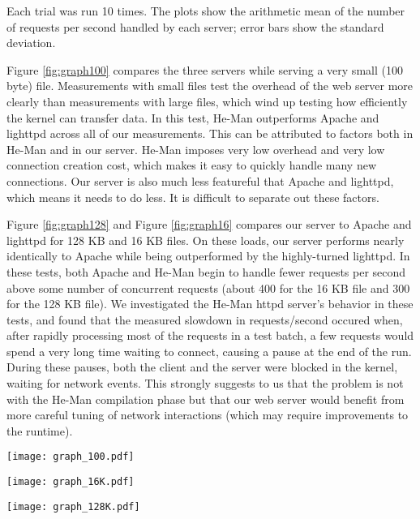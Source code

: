 \documentclass[preprint]{sigplanconf}
\begin{document}
Each trial was run 10 times. The plots show the arithmetic mean of the number of
requests per second handled by each server; error bars show the standard
deviation.


Figure \ref{fig:graph100} compares the three servers while serving a
very small (100 byte) file. Measurements with small files test the
overhead of the web server more clearly than measurements with large
files, which wind up testing how efficiently the kernel can transfer
data. In this test, He-Man outperforms Apache and lighttpd across all
of our measurements. This can be attributed to factors both in He-Man
and in our server. He-Man imposes very low overhead and very low
connection creation cost, which makes it easy to quickly handle many
new connections. Our server is also much less featureful that Apache
and lighttpd, which means it needs to do less. It is difficult to
separate out these factors.

Figure \ref{fig:graph128} and Figure \ref{fig:graph16} compares our
server to Apache and lighttpd for 128 KB and 16 KB files. On these
loads, our server performs nearly identically to Apache while being
outperformed by the highly-turned lighttpd. In these tests, both
Apache and He-Man begin to handle fewer requests per second above some
number of concurrent requests (about 400 for the 16 KB file and 300
for the 128 KB file). We investigated the He-Man httpd server's
behavior in these tests, and found that the measured slowdown in
requests/second occured when, after rapidly processing most of the
requests in a test batch, a few requests would spend a very long time
waiting to connect, causing a pause at the end of the run. During
these pauses, both the client and the server were blocked in the
kernel, waiting for network events. This strongly suggests to us that
the problem is not with the He-Man compilation phase but that our web
server would benefit from more careful tuning of network interactions
(which may require improvements to the runtime).

\begin{figure*}[htbp]
\centering
\texttt{[image: graph\_100.pdf]}
\caption{Web server benchmark, 100 byte file.}
\label{fig:graph100}
\end{figure*}
\begin{figure*}[htbp]
\centering
\texttt{[image: graph\_16K.pdf]}
\caption{Web server benchmark, 16 KB file.}
\label{fig:graph16}
\end{figure*}
\begin{figure*}[htbp]
\centering
\texttt{[image: graph\_128K.pdf]}
\caption{Web server benchmark, 128 KB file.}
\label{fig:graph128}
\end{figure*}
\end{document}
